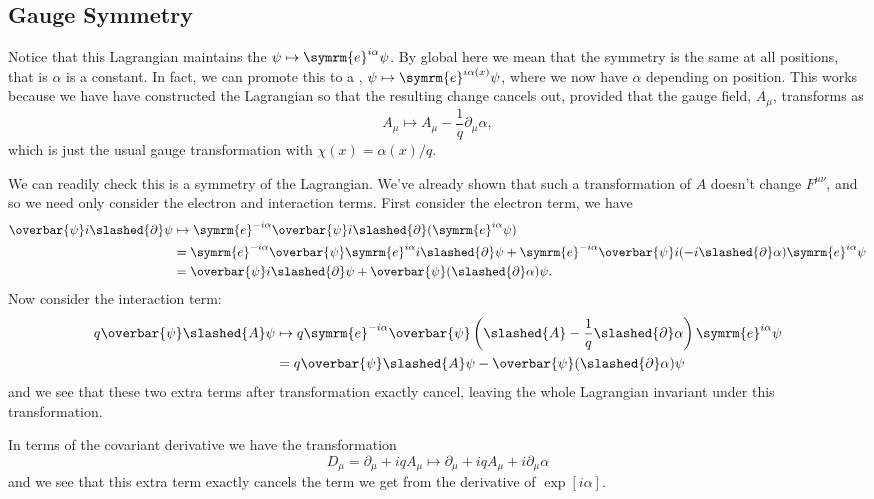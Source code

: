 \documentclass[fleqn]{NotesClass}
\newcommand{\e}{\symrm{e}}
\newcommand{\diracadjoint}[1]{\overbar{#1}}
\newcommand{\covariantDerivative}{D}
\begin{document}
    \subsection{Gauge Symmetry}
    Notice that this Lagrangian maintains the  \(\psi \mapsto \e^{i\alpha}\psi\).
    By global here we mean that the symmetry is the same at all positions, that is \(\alpha\) is a constant.
    In fact, we can promote this to a , \(\psi \mapsto \e^{i\alpha(x)}\psi\), where we now have \(\alpha\) depending on position.
    This works because we have have constructed the Lagrangian so that the resulting change cancels out, provided that the gauge field, \(A_\mu\), transforms as
    \begin{equation}
        A_\mu \mapsto A_\mu - \frac{1}{q}\partial_\mu \alpha,
    \end{equation}
    which is just the usual gauge transformation with \(\chi(x) = \alpha(x)/q\).
    
    We can readily check this is a symmetry of the Lagrangian.
    We've already shown that such a transformation of \(A\) doesn't change \(F^{\mu\nu}\), and so we need only consider the electron and interaction terms.
    First consider the electron term, we have
    \begin{align}
        \diracadjoint{\psi}i\slashed{\partial}\psi &\mapsto \e^{-i\alpha}\diracadjoint{\psi}i\slashed{\partial}(\e^{i\alpha}\psi)\\
        &= \e^{-i\alpha}\diracadjoint{\psi}\e^{i\alpha}i\slashed{\partial}\psi + \e^{-i\alpha}\diracadjoint{\psi}i(-i\slashed{\partial}\alpha)\e^{i\alpha}\psi\\
        &= \diracadjoint{\psi}i\slashed{\partial}\psi + \diracadjoint{\psi}(\slashed{\partial}\alpha)\psi.
    \end{align}
    Now consider the interaction term:
    \begin{align}
        q\diracadjoint{\psi}\slashed{A}\psi &\mapsto q\e^{-i\alpha}\diracadjoint{\psi}\left( \slashed{A} - \frac{1}{q} \slashed{\partial}\alpha \right)\e^{i\alpha}\psi\\
        &= q\diracadjoint{\psi}\slashed{A}\psi - \diracadjoint{\psi}(\slashed{\partial}\alpha)\psi
    \end{align}
    and we see that these two extra terms after transformation exactly cancel, leaving the whole Lagrangian invariant under this transformation.
    
    In terms of the covariant derivative we have the transformation
    \begin{equation}
        \covariantDerivative_\mu = \partial_\mu + iqA_\mu \mapsto \partial_\mu + iqA_\mu + i\partial_\mu \alpha
    \end{equation}
    and we see that this extra term exactly cancels the term we get from the derivative of \(\exp[i\alpha]\).
    
\end{document}
